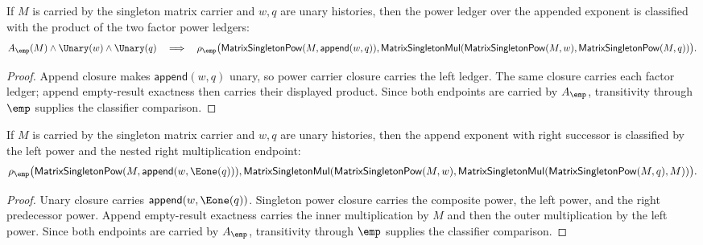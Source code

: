 \begin{theorem}
\label{thm:matrix-singleton-pow-append-exponent-classifier}
If $M$ is carried by the singleton matrix carrier and $w,q$ are unary
histories, then the power ledger over the appended exponent is classified with
the product of the two factor power ledgers:
$$
A_{\emp}(M)\land\Unary(w)\land\Unary(q)
\quad\Longrightarrow\quad
\rho_{\emp}\bigl(\mathsf{MatrixSingletonPow}(M,\mathsf{append}(w,q)),
\mathsf{MatrixSingletonMul}(\mathsf{MatrixSingletonPow}(M,w),
\mathsf{MatrixSingletonPow}(M,q))\bigr).
$$
\end{theorem}
\begin{proof}
Append closure makes $\mathsf{append}(w,q)$ unary, so power carrier closure
carries the left ledger. The same closure carries each factor ledger; append
empty-result exactness then carries their displayed product. Since both
endpoints are carried by $A_{\emp}$, transitivity through $\emp$ supplies the
classifier comparison.
\end{proof}

\begin{theorem}
\label{thm:matrix-singleton-pow-append-succ-right-exponent-classifier}
If $M$ is carried by the singleton matrix carrier and $w,q$ are unary histories,
then the append exponent with right successor is classified by the left power
and the nested right multiplication endpoint:
$$
\rho_{\emp}\bigl(\mathsf{MatrixSingletonPow}(M,\mathsf{append}(w,\Eone(q))),
\mathsf{MatrixSingletonMul}(\mathsf{MatrixSingletonPow}(M,w),
\mathsf{MatrixSingletonMul}(\mathsf{MatrixSingletonPow}(M,q),M))\bigr).
$$
\end{theorem}
\begin{proof}
Unary closure carries $\mathsf{append}(w,\Eone(q))$. Singleton power closure
carries the composite power, the left power, and the right predecessor power.
Append empty-result exactness carries the inner multiplication by $M$ and then
the outer multiplication by the left power. Since both endpoints are carried by
$A_{\emp}$, transitivity through $\emp$ supplies the classifier comparison.
\end{proof}

